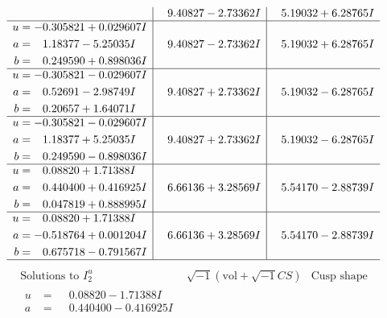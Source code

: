 \documentclass[1p]{elsarticle_modified}
\theoremstyle{definition}
\newcommand{\I}{\sqrt{-1}}
\begin{document}
$$\begin{array}{c|c|c}
 & \phantom{-}9.40827 - 2.73362 I & \phantom{-}5.19032 + 6.28765 I \\ \hline\begin{aligned}
u &= -0.305821 + 0.029607 I \\
a &= \phantom{-}1.18377 - 5.25035 I \\
b &= \phantom{-}0.249590 + 0.898036 I\end{aligned}
 & \phantom{-}9.40827 - 2.73362 I & \phantom{-}5.19032 + 6.28765 I \\ \hline\begin{aligned}
u &= -0.305821 - 0.029607 I \\
a &= \phantom{-}0.52691 - 2.98749 I \\
b &= \phantom{-}0.20657 + 1.64071 I\end{aligned}
 & \phantom{-}9.40827 + 2.73362 I & \phantom{-}5.19032 - 6.28765 I \\ \hline\begin{aligned}
u &= -0.305821 - 0.029607 I \\
a &= \phantom{-}1.18377 + 5.25035 I \\
b &= \phantom{-}0.249590 - 0.898036 I\end{aligned}
 & \phantom{-}9.40827 + 2.73362 I & \phantom{-}5.19032 - 6.28765 I \\ \hline\begin{aligned}
u &= \phantom{-}0.08820 + 1.71388 I \\
a &= \phantom{-}0.440400 + 0.416925 I \\
b &= \phantom{-}0.047819 + 0.888995 I\end{aligned}
 & \phantom{-}6.66136 + 3.28569 I & \phantom{-}5.54170 - 2.88739 I \\ \hline\begin{aligned}
u &= \phantom{-}0.08820 + 1.71388 I \\
a &= -0.518764 + 0.001204 I \\
b &= \phantom{-}0.675718 - 0.791567 I\end{aligned}
 & \phantom{-}6.66136 + 3.28569 I & \phantom{-}5.54170 - 2.88739 I\\
 \hline 
 \end{array}$$\newpage$$\begin{array}{c|c|c}  
\text{Solutions to }I^u_{2}& \I (\text{vol} + \sqrt{-1}CS) & \text{Cusp shape}\\
 \hline 
\begin{aligned}
u &= \phantom{-}0.08820 - 1.71388 I \\
a &= \phantom{-}0.440400 - 0.416925 I \\

\end{aligned}
\end{array}$$
\end{document}

